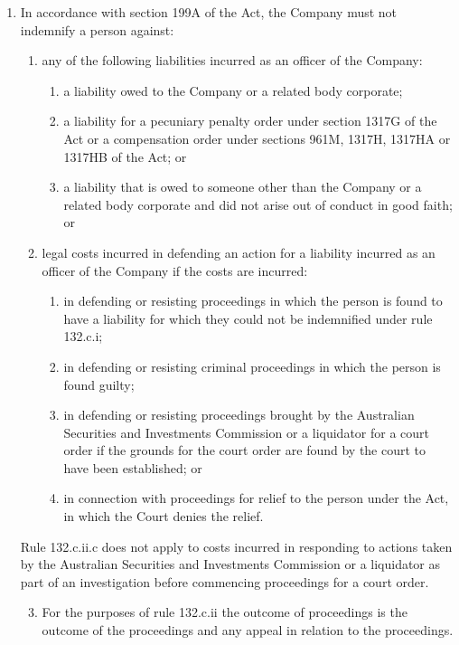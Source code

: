 \begin{enumerate}[label=(\alph*)]
    \item In accordance with section 199A of the Act, the Company must not indemnify a person against:
    \begin{enumerate}[label=(\roman*)]
        \item any of the following liabilities incurred as an officer of the Company:
        \begin{enumerate}[label=(\alph*)]
            \item a liability owed to the Company or a related body corporate;
            \item a liability for a pecuniary penalty order under section 1317G of the Act or a compensation order under sections 961M, 1317H, 1317HA or 1317HB of the Act; or
            \item a liability that is owed to someone other than the Company or a related body corporate and did not arise out of conduct in good faith; or
        \end{enumerate}
        \item legal costs incurred in defending an action for a liability incurred as an officer of the Company if the costs are incurred:
        \begin{enumerate}[label=(\alph*)]
            \item in defending or resisting proceedings in which the person is found to have a liability for which they could not be indemnified under rule 132.c.i;
            \item in defending or resisting criminal proceedings in which the person is found guilty;
            \item in defending or resisting proceedings brought by the Australian Securities and Investments Commission or a liquidator for a court order if the grounds for the court order are found by the court to have been established; or
            \item in connection with proceedings for relief to the person under the Act, in which the Court denies the relief.
        \end{enumerate}
    \end{enumerate}
    
    Rule 132.c.ii.c does not apply to costs incurred in responding to actions taken by the Australian Securities and Investments Commission or a liquidator as part of an investigation before commencing proceedings for a court order.
    
    \begin{enumerate}[label=(\roman*)]
        \setcounter{enumii}{2}
        \item For the purposes of rule 132.c.ii the outcome of proceedings is the outcome of the proceedings and any appeal in relation to the proceedings.
    \end{enumerate}
    

\end{enumerate}
